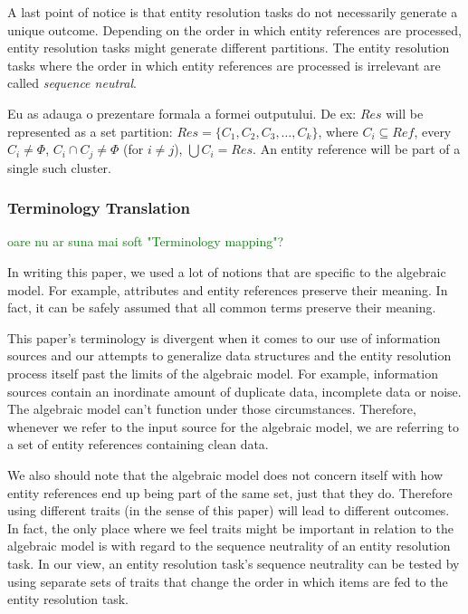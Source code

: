 \documentclass[11pt]{article}
\begin{document}
    A last point of notice is that entity resolution tasks do not necessarily
    generate a unique outcome\cite{Tal11}.
    Depending on the order in which entity references are processed, entity
    resolution tasks might generate different partitions.
    The entity resolution tasks where the order in which entity references are
    processed is irrelevant are called \textit{sequence neutral}\cite{Tal11}.


    Eu as adauga o prezentare formala a formei outputului.
    De ex: $Res$ will be represented as a set partition: $Res = \{C_1, C_2, C_3, \ldots, C_k\}$, where $C_i \subseteq Ref$, every $C_i \neq \Phi$, $C_i \cap C_j \neq \Phi$ (for $i \neq j$), $\bigcup C_i = Res$. An entity reference will be part of a single such cluster. 


    \subsubsection[algrel]{Terminology Translation}\label{subsubsec:algrel}
    \textcolor{green}{oare nu ar suna mai soft "Terminology mapping"?}

    In writing this paper, we used a lot of notions that are specific to the
    algebraic model.
    For example, attributes and entity references preserve their meaning.
    In fact, it can be safely assumed that all common terms preserve their
    meaning.
    
    This paper's terminology is divergent when it comes to our use of
    information sources and our attempts to generalize data structures and the
    entity resolution process itself past the limits of the algebraic model.
    For example, information sources contain an inordinate amount of duplicate
    data, incomplete data or noise.
    The algebraic model can't function under those circumstances.
    Therefore, whenever we refer to the input source for the algebraic model,
    we are referring to a set of entity references containing clean data.
    
    We also should note that the algebraic model does not concern itself with
    how entity references end up being part of the same set, just that they do.
    Therefore using different traits (in the sense of this paper) will lead to
    different outcomes.
    In fact, the only place where we feel traits might be important in relation
    to the algebraic model is with regard to the sequence neutrality of an
    entity resolution task.
    In our view, an entity resolution task's sequence neutrality can be tested
    by using separate sets of traits that change the order in which items are
    fed to the entity resolution task.
\end{document}
